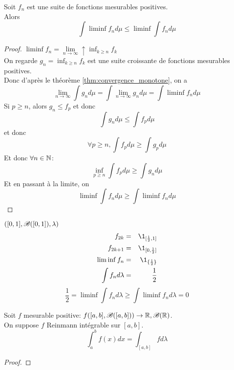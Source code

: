 \begin{theorem}
	Soit $f_n$ est une suite de fonctions mesurables positives.\\
	Alors
	$$ \int \liminf f_n d\mu \leq \liminf \int f_n d\mu $$
\end{theorem}

\begin{proof}
	$\liminf f_n = \lim\limits_{n \to \infty} \uparrow \inf_{k \geq n} f_k$\\
	On regarde $g_n = \inf_{k \geq n} f_k$ est une suite croissante de fonctions mesurables positives.\\
	Donc d'après le théorème \ref{thm:convergence_monotone}, on a
	$$ \lim\limits_{n \to \infty} \int g_n d\mu = \int \lim\limits_{n \to \infty} g_n d\mu = \int \liminf f_n d\mu $$
	Si $p \geq n$, alors $g_n \leq f_p$ et donc
	$$ \int g_n d\mu \leq \int f_p d\mu $$
	et donc
	$$ \forall p \geq n, \int f_p d\mu \geq \int g_p d\mu $$
	Et donc $\forall n \in \mathbb{N}$:
	$$ \inf_{p \geq n} \int f_p d\mu \geq \int g_n d\mu $$
	Et en passant à la limite, on
	$$ \liminf \int f_n d\mu \geq \int \liminf f_n d\mu $$
\end{proof}


\begin{example} $([0,1], \mathscr{B}([0,1]),\lambda)$\\
	\begin{eqnarray*}
		f_{2k} &=& \1_{[\frac{1}{2}, 1]}\\
		f_{2k+1} &=& \1_{[0,\frac{1}{2}]}\\
		\liminf f_n &=& \1_{\{\frac{1}{2}\}}\\
		\int f_n d \lambda &=& \frac{1}{2}
	\end{eqnarray*}
	$$ \frac{1}{2} = \liminf \int f_n d \lambda \geq \int \liminf f_n d \lambda = 0 $$
\end{example}


\begin{theorem}
	Soit $f$ mesurable positive:
	$ f ([a,b], \mathscr{B}([a,b])) \to \mathbb{R}, \mathscr{B}(\mathbb{R})$.\\
	On suppose $f$ Reinmann intégrable sur $[a,b]$.\\
	$$ \int_a^b f(x) dx = \int_{[a,b]} f d\lambda $$
\end{theorem}

\begin{proof} %

\end{proof}
